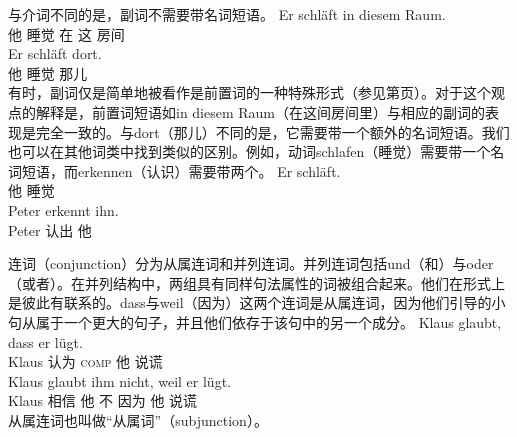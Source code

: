 与介词不同的是，副词不需要带名词短语。
\eal
\ex
\gll Er schläft in diesem Raum.\\
	 他 睡觉 在 这 房间\\
\ex
\gll Er schläft dort.\\
	 他 睡觉 那儿\\
\zl
有时，副词仅是简单地被看作是前置词的一种特殊形式（参见第\pageref{Seite-Adverbien-PP}页）。对于这个观点的解释是，前置词短语如in diesem Raum（在这间房间里）与相应的副词的表现是完全一致的。与dort（那儿）不同的是，它需要带一个额外的名词短语。我们也可以在其他词类中找到类似的区别。例如，动词schlafen（睡觉）需要带一个名词短语，而erkennen（认识）需要带两个。
\eal
\ex 
\gll Er schläft.\\
     他 睡觉\\
\ex 
\gll Peter erkennt ihn.\\
     Peter 认出 他\\
\zl

连词（conjunction）分为从属连词和并列连词。并列连词包括und（和）与oder（或者）。在并列结构中，两组具有同样句法属性的词被组合起来。他们在形式上是彼此有联系的。dass与weil（因为）这两个连词是从属连词，因为他们引导的小句从属于一个更大的句子，并且他们依存于该句中的另一个成分。
\eal
\ex 
\gll Klaus glaubt, dass er lügt.\\
	 Klaus 认为 \textsc{comp} 他 说谎\\
\ex 
\gll Klaus glaubt ihm nicht, weil er lügt.\\
	 Klaus 相信 他 不 因为 他 说谎\\
\zl
从属连词也叫做“从属词”（subjunction）。

